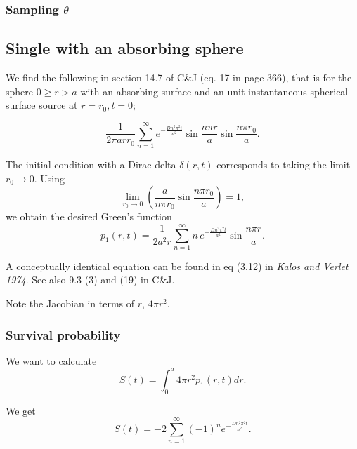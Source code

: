 \documentclass[english]{article}
\begin{document}
\subsubsection{Sampling $\theta$}


\subsection{Single with an absorbing sphere}

We find the following in section 14.7 of C\&J (eq. 17 in page 366),
that is for the sphere $0 \geq r>a$ with an absorbing surface and
an unit instantaneous spherical surface source at $r=r_{0},t=0$;

\begin{equation}
\frac{1}{2\pi arr_{0}}\sum_{n=1}^{\infty}e^{-\frac{Dn^{2}\pi^{2}t}{a^{2}}}\sin\frac{n\pi r}{a}\sin\frac{n\pi r_{0}}{a}.\end{equation}


The initial condition with a Dirac delta $\delta(r,t)$ corresponds to
taking the limit $r_{0}\rightarrow0$. Using 
\begin{equation}
  \lim_{r_{0}\rightarrow0}\left(\frac{a}{n\pi r_{0}}\sin\frac{n\pi
      r_{0}}{a}\right)=1,
\end{equation}
 we obtain the desired Green's function 
 \begin{equation}
   p_{1}(r,t)=\frac{1}{2a^{2}r}\sum_{n=1}^{\infty}n\, e^{-\frac{Dn^{2}\pi^{2}t}{a^{2}}}\sin\frac{n\pi r}{a}.
 \end{equation}


A conceptually identical equation can be found in eq (3.12) in \textit{Kalos
and Verlet 1974}. See also 9.3 (3) and (19) in C\&J.

Note the Jacobian in terms of $r$, $4\pi r^{2}$.


\subsubsection{Survival probability}

We want to calculate \begin{equation}
S(t)=\int_{0}^{a}4\pi r^{2}p_{1}(r,t)dr.\end{equation}


We get \begin{equation}
S(t)=-2\sum_{n=1}^{\infty}(-1)^{n}e^{-\frac{Dn^{2}\pi^{2}t}{a^{2}}}.\end{equation}
\end{document}
